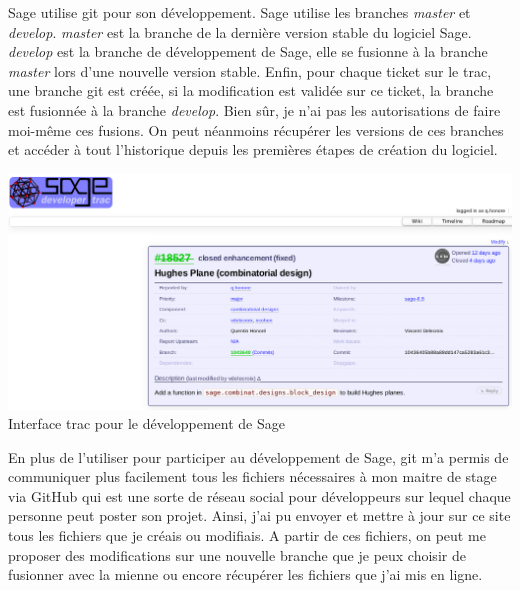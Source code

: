 \documentclass[a4paper]{article}
\begin{document}
Sage utilise git pour son développement. Sage utilise les branches \textit{master} et \textit{develop}. \textit{master} est la branche de la dernière version stable du logiciel Sage. \textit{develop} est la branche de développement de Sage, elle se fusionne à la branche \textit{master} lors d'une nouvelle version stable. Enfin, pour chaque ticket sur le trac, une branche git est créée, si la modification est validée sur ce ticket, la branche est fusionnée à la branche \textit{develop}. Bien sûr, je n'ai pas les autorisations de faire moi-même ces fusions. On peut néanmoins récupérer les versions de ces branches et accéder à tout l'historique depuis les premières étapes de création du logiciel. \vspace{2\baselineskip}\\
\begin{center}
  \includegraphics[scale=0.5]{trac.png}\\
  Interface trac pour le développement de Sage
\end{center}
\vspace{1\baselineskip}
En plus de l'utiliser pour participer au développement de Sage, git m'a permis de communiquer plus facilement tous les fichiers nécessaires à mon maitre de stage via GitHub qui est une sorte de réseau social pour développeurs sur lequel chaque personne peut poster son projet. Ainsi, j'ai pu envoyer et mettre à jour sur ce site tous les fichiers que je créais ou modifiais. A partir de ces fichiers, on peut me proposer des modifications sur une nouvelle branche que je peux choisir de fusionner avec la mienne ou encore récupérer les fichiers que j'ai mis en ligne.


\newpage
\end{document}
